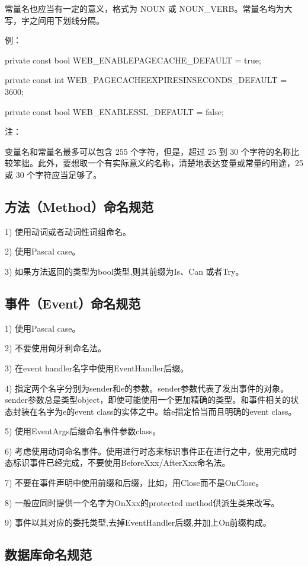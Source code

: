 \documentclass{book}
\begin{document}
常量名也应当有一定的意义，格式为 NOUN 或 NOUN\_VERB。常量名均为大写，字之间用下划线分隔。

例：

     private const bool   WEB\_ENABLEPAGECACHE\_DEFAULT           = true;

     private const int    WEB\_PAGECACHEEXPIRESINSECONDS\_DEFAULT = 3600;

     private const bool   WEB\_ENABLESSL\_DEFAULT                 = false;

注：

变量名和常量名最多可以包含 255 个字符，但是，超过 25 到 30 个字符的名称比较笨拙。此外，要想取一个有实际意义的名称，清楚地表达变量或常量的用途，25 或 30 个字符应当足够了。

\subsection{方法（Method）命名规范}

1)  使用动词或者动词性词组命名。

2)  使用Pascal case。

3) 如果方法返回的类型为bool类型,则其前缀为Is、Can 或者Try。

\subsection{事件（Event）命名规范}

1)  使用Pascal case。

2)  不要使用匈牙利命名法。

3)  在event handler名字中使用EventHandler后缀。

4)  指定两个名字分别为sender和e的参数。sender参数代表了发出事件的对象。sender参数总是类型object，即使可能使用一个更加精确的类型。和事件相关的状态封装在名字为e的event class的实体之中。给e指定恰当而且明确的event class。

5)  使用EventArgs后缀命名事件参数class。

6)  考虑使用动词命名事件。使用进行时态来标识事件正在进行之中，使用完成时态标识事件已经完成，不要使用BeforeXxx/AfterXxx命名法。

7)  不要在事件声明中使用前缀和后缀，比如，用Close而不是OnClose。

8)  一般应同时提供一个名字为OnXxx的protected method供派生类来改写。

9) 事件以其对应的委托类型,去掉EventHandler后缀,并加上On前缀构成。

\subsection{数据库命名规范}
\end{document}
